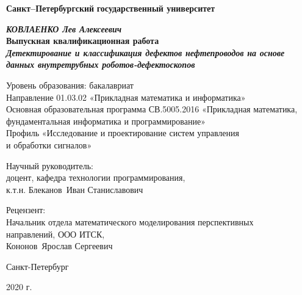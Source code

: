 
\begin{titlepage}
\begin{center}
\textbf{Санкт--Петербургский}
\textbf{государственный университет}

\vspace{35mm}

\textbf{\textit{\large КОВЛАЕНКО Лев Алексеевич}} \\[8mm]
\textbf{\large Выпускная квалификационная работа}\\[3mm]
\textbf{\textit{\large Детектирование и классификация дефектов 
нефтепроводов на основе данных 
внутретрубных роботов-дефектоскопов}}

\vspace{20mm}
Уровень образования: бакалавриат\\
Направление 01.03.02 «Прикладная математика и информатика»\\
Основная образовательная программа СВ.5005.2016
«Прикладная математика, фундаментальная информатика и программирование»\\
Профиль «Исследование и проектирование систем управления\\ и обработки сигналов»\\[30mm]


\begin{flushright}
{Научный руководитель:} \\
доцент, кафедра технологии программирования, \\ к.т.н.  Блеканов~Иван Станиславович
\end{flushright}
\begin{flushright}
{Рецензент:} \\
Начальник отдела математического моделирования перспективных \\ направлений, ООО ИТСК, \\  Кононов~Ярослав Сергеевич
\end{flushright}

\vfill 

{Санкт-Петербург}
\par{2020 г.}
\end{center}
\end{titlepage}
\restoregeometry
\addtocounter{page}{1}
